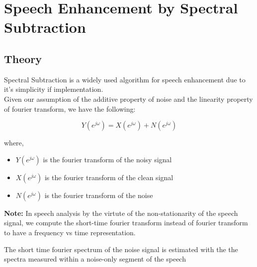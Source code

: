 \chapter{Speech Enhancement by Spectral Subtraction}

\section{Theory}
Spectral Subtraction is a widely used algorithm for speech enhancement due to it's simplicity if implementation.\\ 

Given our assumption of the additive property of noise and the linearity property of fourier transform, we have the following: 

$$ Y(e^{j\omega}) = X(e^{j\omega}) + N(e^{j\omega}) $$ 

where, 
\begin{itemize}
	\item $Y(e^{j\omega})$ is the fourier transform of the noisy signal 
	\item $X(e^{j\omega})$ is the fourier transform of the clean signal
	\item $N(e^{j\omega})$ is the fourier transform of the noise
\end{itemize}

\textbf{Note:} In speech analysis by the virtute of the non-stationarity of the speech signal, we compute the short-time fourier transform instead of fourier transform to have a frequency vs time representation. 


The short time fourier spectrum of the noise signal is estimated with the the spectra measured within a noise-only segment of the speech  